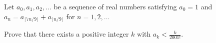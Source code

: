 Let $a_0, a_1, a_2,\ldots $ be a sequence of real numbers satisfying $a_0=1$ and $a_n=a_{\lfloor 7n/9\rfloor}+a_{\lfloor n/9\rfloor}$ for $n=1, 2,\ldots $

Prove that there exists a positive integer $k$ with $a_k<\frac{k}{2001!}$.